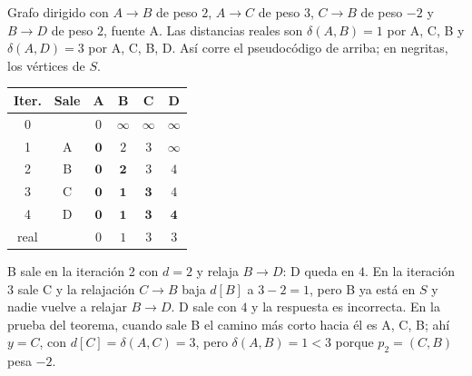 \documentclass[11pt,letterpaper]{article}
\begin{document}
\begin{ejemplo}
  \label{ej:dijkstra-arista-negativa}
  Grafo dirigido con $A \to B$ de peso $2$, $A \to C$ de peso $3$,
  $C \to B$ de peso $-2$ y $B \to D$ de peso $2$, fuente A. Las
  distancias reales son $\delta(A, B) = 1$ por A, C, B y
  $\delta(A, D) = 3$ por A, C, B, D. Así corre el pseudocódigo de
  arriba; en negritas, los vértices de $S$.
  \begin{center}
  \small
  \begin{tabular}{cccccc}
    \toprule
    \textbf{Iter.} & \textbf{Sale} & A & B & C & D \\
    \midrule
    0 & & $0$ & $\infty$ & $\infty$ & $\infty$ \\
    1 & A & $\mathbf{0}$ & $2$ & $3$ & $\infty$ \\
    2 & B & $\mathbf{0}$ & $\mathbf{2}$ & $3$ & $4$ \\
    3 & C & $\mathbf{0}$ & $\mathbf{1}$ & $\mathbf{3}$ & $4$ \\
    4 & D & $\mathbf{0}$ & $\mathbf{1}$ & $\mathbf{3}$ & $\mathbf{4}$
      \\
    \midrule
    real & & $0$ & $1$ & $3$ & $3$ \\
    \bottomrule
  \end{tabular}
  \end{center}
  B sale en la iteración 2 con $d = 2$ y relaja $B \to D$: D queda en
  $4$. En la iteración 3 sale C y la relajación $C \to B$ baja $d[B]$
  a $3 - 2 = 1$, pero B ya está en $S$ y nadie vuelve a relajar
  $B \to D$. D sale con $4$ y la respuesta es incorrecta. En la
  prueba del teorema, cuando sale B el camino más corto hacia él es
  A, C, B; ahí $y = C$, con $d[C] = \delta(A, C) = 3$, pero
  $\delta(A, B) = 1 < 3$ porque $p_2 = (C, B)$ pesa $-2$.
  \begin{center}
\end{center}
\end{ejemplo}
\end{document}
